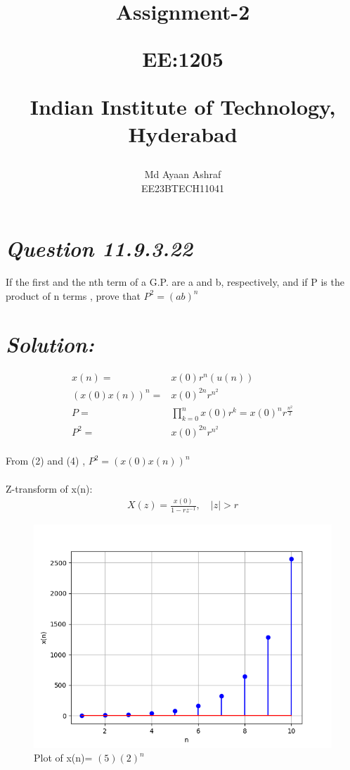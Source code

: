 \documentclass[journal,12pt,twocolumn]{IEEEtran}
\theoremstyle{remark}
\begin{document}
%




\vspace{3cm}

\title{
Assignment-2

\large{EE:1205 }

Indian Institute of Technology, Hyderabad
}
\author{Md Ayaan Ashraf

EE23BTECH11041
}  
\maketitle
\newpage
\bigskip
\renewcommand{\thefigure}{\theenumi}
\renewcommand{\thetable}{\theenumi}
\section*{\textit{\textbf{Question 11.9.3.22}}}
 If the first and the nth term of a G.P. are a and b, respectively, and if P is the product of n terms , prove that $ P^2 = (ab)^n $
\section*{\textit{\textbf{Solution:}}}

\begin{align}
x(n) = & x(0)r^{n} (u(n))\\
(x(0)x(n))^n = & x(0)^{2n} r^{n^2}\\
P =& \prod_{k=0}^{n} x(0)r^{k}= x(0)^n r^{\frac{n^2}{2}}\\
P^2 =& x(0)^{2n} r^{n^2}
\end{align}
\\
From (2) and (4) , $ P^2 = (x(0)x(n))^n $\\
\\
Z-transform of x(n):
\begin{align}
X(z)= \frac{x(0)}{1-rz^{-1}} , \quad{|z|>r}
\end{align}
\begin{figure}[ht]
    \centering
    \includegraphics[width=\columnwidth]{figs/fig.png}
    \caption{Plot of x(n)= $(5)(2)^n$}
    \label{fig: 11.9.3.22}
\end{figure}
\end{document}

